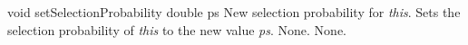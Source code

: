 \vspace*{4ex}

\setNormalInstance
\printMethodWithOneParam
{void}
{setSelectionProbability}
{double}
{ps}
{New selection probability for {\em this}.}
{Sets the selection probability of {\em this} to the new value {\em ps}.}
{None.}
{None.}




